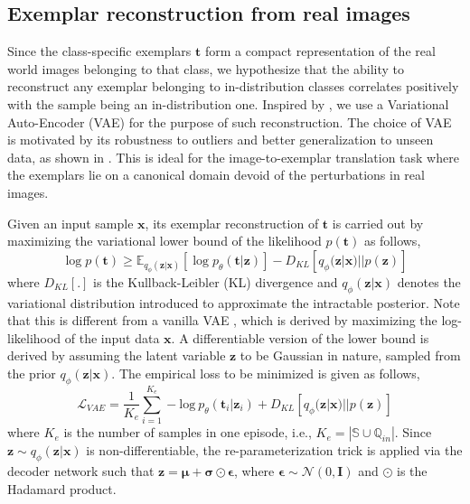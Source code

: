 \subsection{Exemplar reconstruction from real images} \label{rec_mod}
Since the class-specific exemplars $\mathbf{t}$ form a compact representation of the real world images belonging to that class, we hypothesize that the ability to reconstruct any exemplar belonging to in-distribution classes correlates positively with the sample being an in-distribution one. Inspired by \cite{kim2019variational}, we use a Variational Auto-Encoder (VAE) \cite{Kingma2014} for the purpose of such reconstruction. The choice of VAE is motivated by its robustness to outliers and better generalization to unseen data, as shown in \cite{dai2018connections}. This is ideal for the image-to-exemplar translation task where the exemplars lie on a canonical domain devoid of the perturbations in real images. 

Given an input sample $\mathbf{x}$, its exemplar reconstruction of $\mathbf{t}$ is carried out by maximizing the variational lower bound of the likelihood $p({\mathbf{t}})$ \cite{kim2019variational} as follows,
\begin{equation}\label{elbo}
     \log p(\mathbf{t}) 
     \geq \mathbb{E}_{q_{\phi}(\mathbf{z}|\mathbf{x})} [\log   p_{\theta}(\mathbf{t}|\mathbf{z})] - D_{KL}[q_{\phi}(\mathbf{z}|\mathbf{x})||p(\mathbf{z})]
\end{equation}
where $D_{KL}[.]$ is the Kullback-Leibler (KL) divergence and $q_{\phi}(\mathbf{z}|{\mathbf{x}})$ denotes the variational distribution introduced to approximate the intractable posterior. Note that this is different from a vanilla VAE \cite{Kingma2014}, which is derived by maximizing the log-likelihood of the input data $\mathbf{x}$. A differentiable version of the lower bound is derived by assuming the latent variable $\mathbf{z}$ to be Gaussian in nature, sampled from the prior $q_{\phi}(\mathbf{z}|{\mathbf{x}})$. The empirical loss to be minimized is given as follows, 
\begin{equation}\label{recon_loss}
    \mathcal{L}_{VAE} = \frac{1}{K_e}\sum_{i=1}^{K_e}-\text{log}\ p_{\theta}({\mathbf{t}}_i|\mathbf{z}_i)+D_{KL}[q_{\phi}(\mathbf{z}|{\mathbf{x}})||p(\mathbf{z})]
\end{equation}
where $K_e$ is the number of samples in one episode, i.e., $K_e=|\mathbb{S}\cup\mathbb{Q}_{in}|$. Since $\mathbf{z} \sim q_{\phi}(\mathbf{z}|{\mathbf{x}})$ is non-differentiable, the re-parameterization trick is applied via the decoder network \cite{Kingma2014} such that $\mathbf{z} = \mathbf{\mu} + 
\mathbf{\sigma}\odot\mathbf{\epsilon}$, where $\mathbf{\epsilon} \sim \mathcal{N}(0,\textbf{I})$ and $\odot$ is the Hadamard product. 


